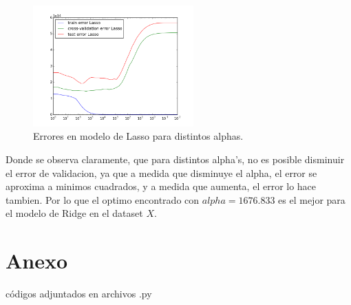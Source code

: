 \documentclass[10pt]{article}
\begin{document}
\begin{itemize}
\begin{figure}[!htb]
    \centering
    \includegraphics[width=0.55\textwidth]{images/comparacion_lasso}
    \caption{Errores en modelo de Lasso para distintos alphas.}
    \label{err:lasso}
\end{figure}

Donde se observa claramente, que para distintos alpha's, no es posible disminuir el error de validacion, ya que a medida que disminuye el alpha, el error se aproxima a minimos cuadrados, y a medida que aumenta, el error lo hace tambien. Por lo que el optimo encontrado con $alpha = 1676.833$ es el mejor para el modelo de Ridge en el dataset $X$. 


\end{itemize}
 
\section*{Anexo}

códigos adjuntados en archivos .py




\end{document}
